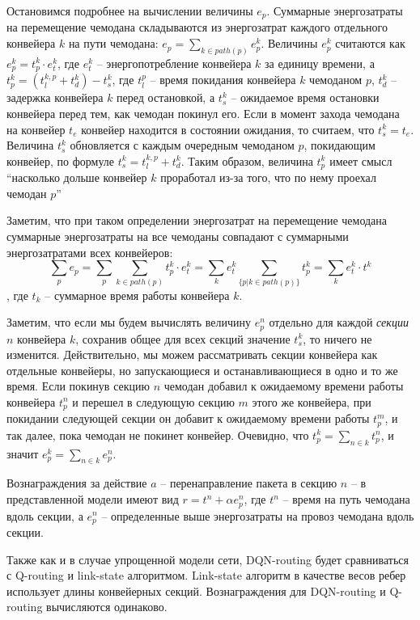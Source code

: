 \documentclass[specification, annotation]{itmo-student-thesis}
\begin{document}
Остановимся подробнее на вычислении величины $e_p$. Суммарные энергозатраты на
перемещение чемодана складываются из энергозатрат каждого отдельного конвейера
$k$ на пути чемодана: $e_p = \sum\limits_{k \in path(p)} {e_p^k}$.
Величины $e_p^k$ считаются как $e_p^k = t_p^k \cdot e_t^k$, где $e_t^k$ --
энергопотребление конвейера $k$ за единицу времени, а
$t_p^k = (t_l^{k,p} + t_d^k) - t_s^k$, где $t_l^p$ -- время покидания конвейера $k$
чемоданом $p$, $t_d^k$ -- задержка конвейера $k$ перед остановкой, а $t_s^k$ --
ожидаемое время остановки конвейера перед тем, как чемодан покинул его. Если в
момент захода чемодана на конвейер $t_e$ конвейер находится в состоянии
ожидания, то считаем, что $t_s^k = t_e$. Величина $t_s^k$ обновляется с каждым
очередным чемоданом $p$, покидающим конвейер, по формуле
$t_s^k = t_l^{k,p} + t_d^k$. Таким образом, величина $t_p^k$ имеет смысл
``насколько дольше конвейер $k$ проработал из-за того, что по нему проехал
чемодан $p$''

Заметим, что при таком определении энергозатрат на перемещение чемодана
суммарные энергозатраты на все чемоданы совпадают с суммарными энергозатратами
всех конвейеров:
\[
\sum\limits_p {e_p} = \sum\limits_p {\sum\limits_{k \in path(p)} {t_p^k \cdot
    e_t^k}} = \sum\limits_k {e_t^k \sum\limits_{\{p | k \in path(p)\}} {t_p^k}}
= \sum\limits_k {e_t^k \cdot t^k} 
\],
где $t_k$ -- суммарное время работы конвейера $k$.

Заметим, что если мы будем вычислять величину $e_p^n$ отдельно для каждой
\textit{секции} $n$ конвейера $k$, сохранив общее для всех секций значение
$t_s^k$, то ничего не изменится. Действительно, мы можем рассматривать секции
конвейера как отдельные конвейеры, но запускающиеся и останавливающиеся в одно и
то же время. Если покинув секцию $n$ чемодан добавил к ожидаемому времени работы
конвейера $t_p^n$ и перешел в следующую секцию $m$ этого же конвейера, при покидании
следующей секции он добавит к ожидаемому времени работы $t_p^m$, и так далее,
пока чемодан не покинет конвейер. Очевидно, что $t_p^k = \sum_{n \in k} t_p^n$,
и значит $e_p^k = \sum_{n \in k} e_p^n$. 

Вознаграждения за действие $a$ -- перенаправление пакета в секцию $n$ -- в
представленной модели имеют вид $r = t^n + \alpha e_p^n$, где $t^n$ -- время на
путь чемодана вдоль секции, а $e_p^n$ -- определенные выше энергозатраты на
провоз чемодана вдоль секции.

Также как и в случае упрощенной модели сети, DQN-routing будет сравниваться с
Q-routing и link-state алгоритмом. Link-state алгоритм в качестве весов ребер
использует длины конвейерных секций. Вознаграждения для DQN-routing и Q-routing
вычисляются одинаково.
\end{document}

